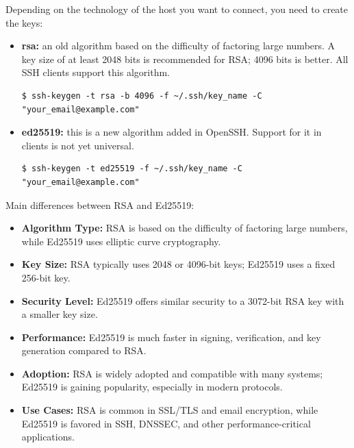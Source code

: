 \documentclass{article}
\newenvironment{blocktemplateI}[1]{%
    \tcolorbox[beamer,%
    noparskip,breakable,
    colframe=Violet,%
    colbacklower=Black,%
    title=#1]}%
    {\endtcolorbox}
\newenvironment{codetemplate}[1][]{%
  \mybasecolorbox[#1]
  \itshape
}{%
  \endmybasecolorbox
}
\begin{document}
Depending on the technology of the host you want to connect, you need to create the keys:

\begin{itemize}
    \item \textbf{rsa:} an old algorithm based on the difficulty of factoring large numbers. A key size of at least 2048 bits is recommended for RSA; 4096 bits is better. All SSH clients support this algorithm.
\begin{codetemplate}{}
\begin{verbatim}
$ ssh-keygen -t rsa -b 4096 -f ~/.ssh/key_name -C "your_email@example.com" 
\end{verbatim}
\end{codetemplate}
    \item \textbf{ed25519:} this is a new algorithm added in OpenSSH. Support for it in clients is not yet universal.
\begin{codetemplate}{}
\begin{verbatim}
$ ssh-keygen -t ed25519 -f ~/.ssh/key_name -C "your_email@example.com"
\end{verbatim}
\end{codetemplate}
\end{itemize}

\begin{blocktemplateI}{Note}
Main differences between RSA and Ed25519:
\begin{itemize}
    \item \textbf{Algorithm Type:} RSA is based on the difficulty of factoring large numbers, while Ed25519 uses elliptic curve cryptography.
    \item \textbf{Key Size:} RSA typically uses 2048 or 4096-bit keys; Ed25519 uses a fixed 256-bit key.
    \item \textbf{Security Level:} Ed25519 offers similar security to a 3072-bit RSA key with a smaller key size.
    \item \textbf{Performance:} Ed25519 is much faster in signing, verification, and key generation compared to RSA.
    \item \textbf{Adoption:} RSA is widely adopted and compatible with many systems; Ed25519 is gaining popularity, especially in modern protocols.
    \item \textbf{Use Cases:} RSA is common in SSL/TLS and email encryption, while Ed25519 is favored in SSH, DNSSEC, and other performance-critical applications.
\end{itemize}
\end{blocktemplateI}
\end{document}
